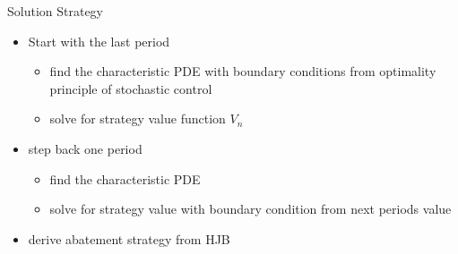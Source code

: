 {Solution Strategy}
\begin{itemize}
\item<1-> Start with the last period
\begin{itemize}
\item find the characteristic PDE with boundary conditions from optimality principle of stochastic control
\item solve for strategy value function $V_n$
\end{itemize}
\item<2-> step back one period
\begin{itemize}
\item find the characteristic PDE
\item solve for strategy value with boundary condition from next periods value
\end{itemize}
\item<3-> derive abatement strategy from HJB
\end{itemize}

